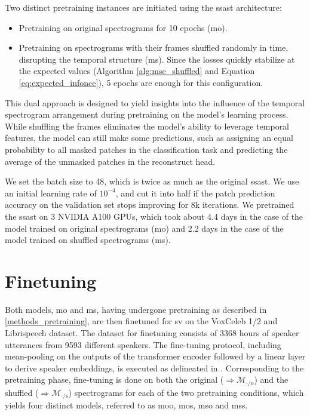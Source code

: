 %
%
Two distinct pretraining instances are initiated using the \gls{ssast} architecture:
\vspace{-\parskip}
\begin{itemize}[topsep=0.5\parskip, itemsep=0.0\parskip, parsep=0.5\parskip]
    \item Pretraining on original spectrograms for 10 epochs (\gls{mo}).
    \item Pretraining on spectrograms with their frames shuffled randomly in time, disrupting the temporal structure (\gls{ms}). Since the losses quickly stabilize at the expected values (Algorithm \ref{alg:mse_shuffled} and Equation \ref{eq:expected_infonce}), 5 epochs are enough for this configuration.
\end{itemize}

This dual approach is designed to yield insights into the influence of the temporal spectrogram arrangement during pretraining on the model's learning process. While shuffling the frames eliminates the model's ability to leverage temporal features, the model can still make some predictions, such as assigning an equal probability to all masked patches in the classification task and predicting the average of the unmasked patches in the reconstruct head. 

We set the batch size to 48, which is twice as much as the original \gls{ssast}. We use an initial learning rate of $10^{-4}$, and cut it into half if the patch prediction accuracy on the validation set stops improving for 8k iterations. We pretrained the \gls{ssast} on 3 NVIDIA A100 GPUs, which took about 4.4 days in the case of the model trained on original spectrograms (\gls{mo}) and 2.2 days in the case of the model trained on shuffled spectrograms (\gls{ms}). 



\section{Finetuning}
\label{sec:met:finetuning}

%
%
%
%
Both models, \gls{mo} and \gls{ms}, having undergone pretraining as described in \ref{methods_pretraining}, are then finetuned for \gls{sv} on the VoxCeleb 1/2 and Librispeech dataset. The dataset for finetuning consists of 3368 hours of speaker utterances from 9593 different speakers. The fine-tuning protocol, including mean-pooling on the outputs of the transformer encoder followed by a linear layer to derive speaker embeddings, is executed as delineated in \cite{gong2022ssast}. Corresponding to the pretraining phase, fine-tuning is done on both the original ($\Rightarrow \mathcal{M}_\text{$\cdot$/o}$) and the shuffled ($\Rightarrow \mathcal{M}_\text{$\cdot$/s}$) spectrograms for each of the two pretraining conditions, which yields four distinct models, referred to as \gls{moo}, \gls{mos}, \gls{mso} and \gls{mss}.

